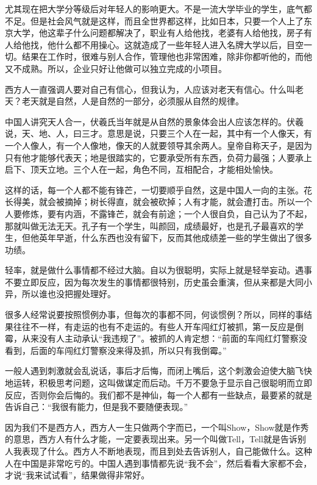 \documentclass[fontset=fandol, a4paper, 12pt, openright]{ctexbook}
\begin{document}
尤其现在把大学分等级后对年轻人的影响更大。不是一流大学毕业的学生，底气都不足。但是社会风气就是这样，而且全世界都这样，比如日本，只要一个人上了东京大学，他这辈子什么问题都解决了，职业有人给他找，老婆有人给他找，房子有人给他找，他什么都不用操心。这就造成了一些年轻人进入名牌大学以后，目空一切。结果在工作时，很难与别人合作，管理他也非常困难，除非你都听他的，而他又不成熟。所以，企业只好让他做可以独立完成的小项目。

西方人一直强调人要对自己有信心，但我认为，人应该对老天有信心。什么叫老天？老天就是自然，人是自然的一部分，必须服从自然的规律。

中国人讲究天人合一，伏羲氏当年就是从自然的景象体会出人应该怎样的。伏羲说，天、地、人，曰三才。意思是说，只要三个人在一起，其中有一个人像天，有一个人像人，有一个人像地，像天的人就要领导其余两人。皇帝自称天子，是因为只有他才能够代表天；地是很踏实的，它要承受所有东西，负荷力最强；人要承上启下、顶天立地。三个人在一起，角色不同，互相配合，才能相处愉快。

这样的话，每一个人都不能有锋芒，一切要顺乎自然，这是中国人一向的主张。花长得美，就会被摘掉；树长得直，就会被砍掉；人有才能，就会遭打击。所以一个人要修炼，要有内涵，不露锋芒，就会有前途；一个人很自负，自己认为了不起，那就叫做无法无天。孔子有一个学生，叫颜回，成绩最好，也是孔子最喜欢的学生，但他英年早逝，什么东西也没有留下，反而其他成绩差一些的学生做出了很多功绩。

轻率，就是做什么事情都不经过大脑。自以为很聪明，实际上就是轻举妄动。遇事不要立即反应，因为每次发生的事情都很特别，历史虽会重演，但从来都是大同小异，所以谁也没把握处理好。

很多人经常说要按照惯例办事，但每次的事都不同，何谈惯例？所以，同样的事结果往往不一样，有走运的也有不走运的。有些人开车闯红灯被抓，第一反应是倒霉，从来没有人主动承认“我违规了”。被抓的人肯定想：“前面的车闯红灯警察没看到，后面的车闯红灯警察没来得及抓，所以只有我倒霉。”

一般人遇到刺激就会乱说话，事后才后悔，而闭上嘴后，这个刺激会迫使大脑飞快地运转，积极思考问题，这叫做谋定而后动。千万不要急于显示自己很聪明而立即反应，否则你会后悔的。我们都不是神仙，每一个人都有一些缺点，最要紧的就是告诉自己：“我很有能力，但是我不要随便表现。”

因为我们不是西方人，西方人一生只做两个字而已，一个叫Show，Show就是作秀的意思，西方人有什么才能，一定要表现出来。另一个叫做Tell，Tell就是告诉别人我表现了什么。西方人不断地表现，而且到处去告诉别人，自己能做什么。这种人在中国是非常吃亏的。中国人遇到事情都先说“我不会”，然后看看大家都不会，才说“我来试试看”，结果做得非常好。
\end{document}
